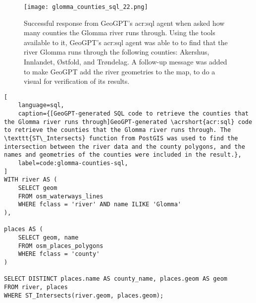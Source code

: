 \begin{figure}[htbp]
    \centering
    \texttt{[image: glomma\_counties\_sql\_22.png]}
    \caption[Successful response from GeoGPT's SQL agent when asked how many counties the Glomma river runs through]{Successful response from GeoGPT's \acrshort{acr:sql} agent when asked how many counties the Glomma river runs through. Using the tools available to it, GeoGPT's \acrshort{acr:sql} agent was able to to find that the river Glomma runs through the following counties: Akershus, Innlandet, Østfold, and Trøndelag. A follow-up message was added to make GeoGPT add the river geometries to the map, to do a visual for verification of its results.}
    \label{fig:glomma-counties-sql-successful}
\end{figure}

\FloatBarrier

\begin{lstlisting}[
    language=sql,
    caption={[GeoGPT-generated SQL code to retrieve the counties that the Glomma river runs through]GeoGPT-generated \acrshort{acr:sql} code to retrieve the counties that the Glomma river runs through. The \texttt{ST\_Intersects} function from PostGIS was used to find the intersection between the river data and the county polygons, and the names and geometries of the counties were included in the result.},
    label=code:glomma-counties-sql,
]
WITH river AS (
    SELECT geom 
    FROM osm_waterways_lines 
    WHERE fclass = 'river' AND name ILIKE 'Glomma'
),

places AS (
    SELECT geom, name 
    FROM osm_places_polygons 
    WHERE fclass = 'county'
)

SELECT DISTINCT places.name AS county_name, places.geom AS geom
FROM river, places
WHERE ST_Intersects(river.geom, places.geom);    
\end{lstlisting}

\FloatBarrier

